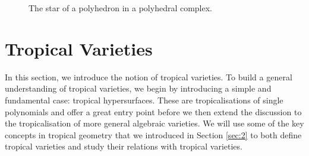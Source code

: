 \documentclass[11pt,reqno,a4paper]{article}
\theoremstyle{theoremstyle}
\theoremstyle{examplestyle}
\theoremstyle{algorithmstyle}
\numberwithin{equation}{subsection}
\begin{document}
\begin{figure}[h]
    \centering
    \caption{The star of a polyhedron in a polyhedral complex.}
    \label{fig:starex}
\end{figure}

\section{Tropical Varieties}
In this section, we introduce the notion of tropical varieties. To build a general understanding of tropical varieties, we begin by introducing a simple and fundamental case: tropical hypersurfaces. These are tropicalisations of single polynomials and offer a great entry point before we then extend the discussion to the tropicalisation of more general algebraic varieties. We will use some of the key concepts in tropical geometry that we introduced in Section \ref{sec:2} to both define tropical varieties and study their relations with tropical varieties.
\end{document}
